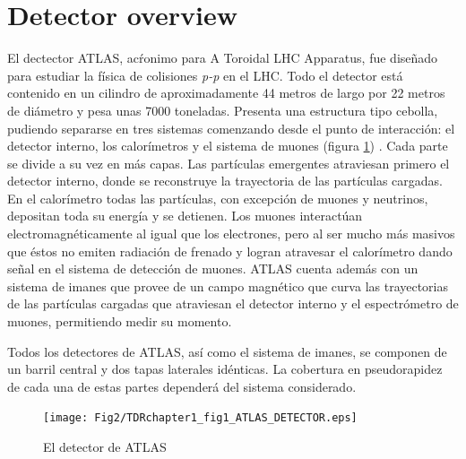 \section{Detector overview}\label{sec:atlassummary}
El dectector ATLAS, ac\'ronimo para A Toroidal LHC Apparatus, fue dise\~nado para estudiar la f\'isica de colisiones \emph{p-p} en el LHC. Todo el detector est\'a contenido en un cilindro de aproximadamente 44 metros de largo por 22 metros de di\'ametro y pesa unas 7000 toneladas\cite{TDR}.  Presenta una estructura tipo cebolla, pudiendo separarse en tres sistemas comenzando desde el punto de interacci\'on: el detector interno, los calor\'imetros y el sistema de muones (figura \ref{fig:ATLAS}) . Cada parte se divide a su vez en m\'as capas. Las part\'iculas emergentes atraviesan primero el detector interno, donde se reconstruye la trayectoria de las part\'iculas cargadas. En el calor\'imetro todas las part\'iculas, con excepci\'on de muones y neutrinos, depositan toda su energ\'ia y se detienen. Los muones interact\'uan electromagn\'eticamente al igual que los electrones, pero al ser mucho m\'as masivos que \'estos no emiten radiaci\'on de frenado y logran atravesar el calor\'imetro dando se\~nal en el sistema de detecci\'on de muones. ATLAS cuenta adem\'as con un sistema de imanes que provee de un campo magn\'etico que curva las trayectorias de las part\'iculas cargadas que atraviesan el detector interno y el espectr\'ometro de muones, permitiendo medir su momento.

   Todos los detectores de ATLAS, as\'i como el sistema de imanes, se componen de un barril central y dos tapas laterales id\'enticas. La cobertura en pseudorapidez de cada una de estas partes depender\'a del sistema considerado.

\begin{figure}[htbp]
  \begin{center}
      \texttt{[image: Fig2/TDRchapter1\_fig1\_ATLAS\_DETECTOR.eps]}
    \caption{El detector de ATLAS}
    \label{fig:ATLAS}
  \end{center}
\end{figure}


